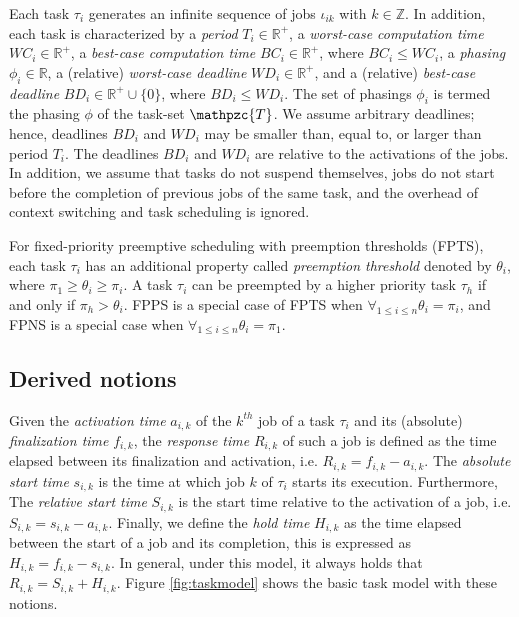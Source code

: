 \documentclass[conference,compsoc]{IEEEtran}
\begin{document}
Each task $\tau_i$ generates an infinite sequence of jobs $\iota_{ik}$ with $k\in \mathbb{Z}$. In addition, each task is characterized by a \textit{period} $T_i \in \mathbb{R^{+}}$, a \textit{worst-case computation time} $WC_i \in \mathbb{R^{+}}$, a \textit{best-case computation time} $BC_i \in \mathbb{R^{+}}$, where $BC_i \leq WC_i$, a \textit{phasing} $\phi_i \in \mathbb{R}$, a (relative) \textit{worst-case deadline} $WD_i \in \mathbb{R^{+}}$, and a (relative) \textit{best-case deadline} $BD_i \in \mathbb{R^{+}}\cup \{0\}$, where $BD_i \leq WD_i$. The set of phasings $\phi_i$ is termed the phasing $\phi$ of the task-set $\mathpzc{T}$. We assume arbitrary deadlines; hence, deadlines $BD_i$ and $WD_i$ may be smaller than, equal to, or larger than period $T_i$. The deadlines $BD_i$ and $WD_i$ are relative to the activations of the jobs. In addition, we assume that tasks do not suspend themselves, jobs do not start before the completion of previous jobs of the same task, and the overhead of context switching and task scheduling is ignored.

For fixed-priority preemptive scheduling with preemption thresholds (FPTS), each task $\tau_i$ has an additional property called \textit{preemption threshold} denoted by $\theta_i$, where $\pi_1 \geq \theta_i \geq \pi_i$. A task $\tau_i$ can be preempted by a higher priority task $\tau_h$ if and only if $\pi_h > \theta_i$. FPPS is a special case of FPTS when $\forall_{1\leq i \leq n}\theta_i = \pi_i$, and FPNS is a special case when $\forall_{1\leq i \leq n}\theta_i = \pi_1$.

\subsection{Derived notions}
Given the \textit{activation time} $a_{i,k}$ of the $k^{th}$ job of a task $\tau_i$ and its (absolute) \textit{finalization time} $f_{i,k}$, the \textit{response time} $R_{i,k}$ of such a job is defined as the time elapsed between its finalization and activation, i.e. $R_{i,k}=f_{i,k}-a_{i,k}$. The \textit{absolute start time} $s_{i,k}$ is the time at which job $k$ of $\tau_i$ starts its execution. Furthermore, The \textit{relative start time} $S_{i,k}$ is the start time relative to the activation of a job, i.e. $S_{i,k}=s_{i,k}-a_{i,k}$. Finally, we define the \textit{hold time} $H_{i,k}$ as the time elapsed between the start of a job and its completion, this is expressed as $H_{i,k}=f_{i,k}-s_{i,k}$. In general, under this model, it always holds that $R_{i,k}=S_{i,k}+H_{i,k}$. Figure \ref{fig:taskmodel} shows the basic task model with these notions.
\end{document}
